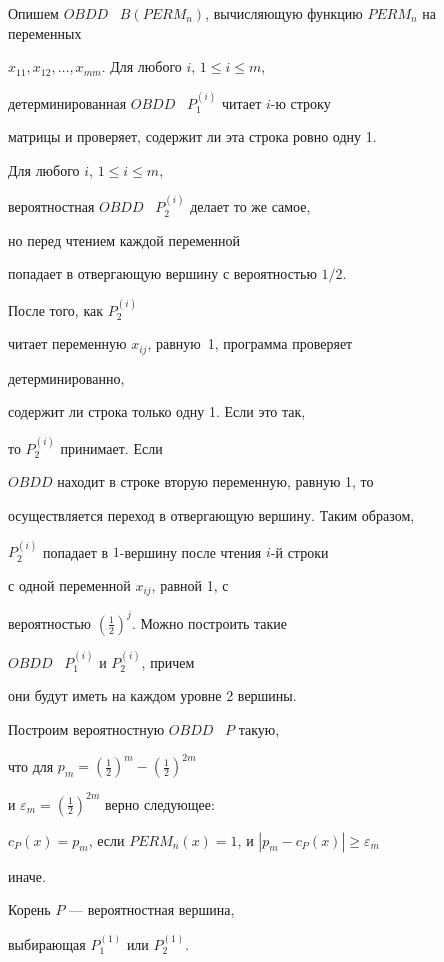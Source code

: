 \begin{pf}


Опишем $OBDD$ \ $B(PERM_n)$, вычисляющую функцию $PERM_n$ на переменных


$x_{11},x_{12},\dotsc,x_{mm}$. Для любого $i$, $1\le i\le m$,


детерминированная $OBDD$ \ $P_1^{(i)}$ читает $i$-ю строку


матрицы и проверяет, содержит ли эта строка ровно одну 1.


Для любого $i$, $1\le i\le m$,


вероятностная $OBDD$ \ $P_2^{(i)}$ делает то же самое,


но перед чтением каждой переменной


попадает в отвергающую вершину с вероятностью $1/2$.


После того, как $P_2^{(i)}$


читает переменную $x_{ij}$, равную~1, программа проверяет


детерминированно,


содержит ли строка только одну 1. Если это так,


то $P_2^{(i)}$ принимает. Если


$OBDD$ находит в строке вторую переменную, равную 1, то


осуществляется переход в отвергающую вершину. Таким образом,


$P_2^{(i)}$ попадает в $1$-вершину после чтения $i$-й строки


с одной переменной $x_{ij}$, равной 1, с


вероятностью $(\frac{1}{2})^j$. Можно построить такие


$OBDD$ \ $P_1^{(i)}$ и $P_2^{(i)}$, причем


они будут иметь на каждом уровне 2 вершины.





Построим вероятностную $OBDD$ \ $P$ такую,


что для $p_m=(\frac{1}{2})^m-(\frac{1}{2})^{2m}$


и $\varepsilon_m=(\frac{1}{2})^{2m}$ верно следующее:


$c_P(x)=p_m$, если $PERM_n(x)=1$, и $|p_m-c_P(x)|\ge\varepsilon_m$


иначе.





Корень $P$ --- вероятностная вершина,


выбирающая $P_1^{(1)}$ или $P_2^{(1)}$.



\end{pf}
